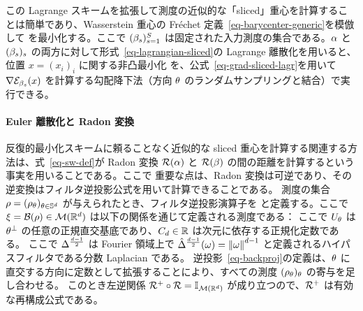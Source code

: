 この Lagrange スキームを拡張して測度の近似的な「sliced」重心を計算することは簡単であり、Wasserstein 重心の Fr\'echet 定義~\eqref{eq-barycenter-generic}を模倣して
を最小化する。ここで $(\beta_s)_{s=1}^S$ は固定された入力測度の集合である。$\alpha$ と $(\beta_s)_s$ の両方に対して形式~\eqref{eq-lagrangian-sliced}の Lagrange 離散化を用いると、位置 $x=(x_i)_i$ に関する非凸最小化
を、公式~\eqref{eq-grad-sliced-lagr}を用いて $\nabla \mathcal{E}_{\beta_s}(x)$ を計算する勾配降下法（方向 $\theta$ のランダムサンプリングと結合）で実行できる。




\paragraph{Euler 離散化と Radon 変換}

反復的最小化スキームに頼ることなく近似的な sliced 重心を計算する関連する方法は、式~\eqref{eq-sw-def}が Radon 変換 $\mathcal{R}(\alpha)$ と $\mathcal{R}(\beta)$ の間の距離を計算するという事実を用いることである。ここで
重要な点は、Radon 変換は可逆であり、その逆変換はフィルタ逆投影公式を用いて計算できることである。
測度の集合 $\rho = (\rho_\theta)_{\theta \in \mathbb{S}^d}$ が与えられたとき、フィルタ逆投影演算子を
と定義する。ここで $\xi = \mathcal{B}(\rho) \in \mathcal{M}(\mathbb{R}^d)$ は以下の関係を通じて定義される測度である：
ここで $U_\theta$ は $\theta^\bot$ の任意の正規直交基底であり、$C_d \in \mathbb{R}$ は次元に依存する正規化定数である。
ここで $\Delta^{\frac{d-1}{2}}$ は Fourier 領域上で $\hat {\Delta}^{\frac{d-1}{2}}(\omega) = \left\| \omega \right\|^{d-1}$ と定義されるハイパスフィルタである分数 Laplacian である。
逆投影~\eqref{eq-backproj}の定義は、$\theta$ に直交する方向に定数として拡張することにより、すべての測度 $(\rho_\theta)_\theta$ の寄与を足し合わせる。
このとき左逆関係 $\mathcal{R}^+ \circ \mathcal{R} = \mathbb{I}_{\mathcal{M}(\mathbb{R}^d)}$ が成り立つので、$\mathcal{R}^+$ は有効な再構成公式である。



